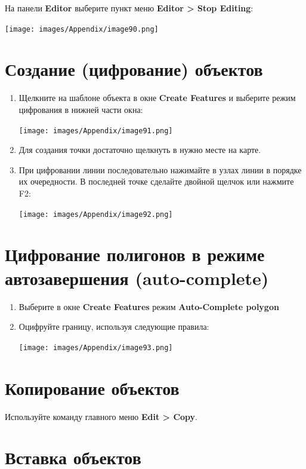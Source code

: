 \documentclass[12pt,]{book}
\begin{document}
На панели \textbf{Editor} выберите пункт меню \textbf{Editor \textgreater{} Stop Editing}:

\texttt{[image: images/Appendix/image90.png]}

\hypertarget{manual-edit-create}{%
\section{Создание (цифрование) объектов}\label{manual-edit-create}}

\begin{enumerate}
\def\labelenumi{\arabic{enumi}.}
\item
  Щелкните на шаблоне объекта в окне \textbf{Create Features} и выберите режим цифрования в нижней части окна:

  \texttt{[image: images/Appendix/image91.png]}
\item
  Для создания точки достаточно щелкнуть в нужно месте на карте.
\item
  При цифровании линии последовательно нажимайте в узлах линии в порядке их очередности. В последней точке сделайте двойной щелчок или нажмите F2:

  \texttt{[image: images/Appendix/image92.png]}
\end{enumerate}

\hypertarget{manual-edit-complete}{%
\section{Цифрование полигонов в режиме автозавершения (auto-complete)}\label{manual-edit-complete}}

\begin{enumerate}
\def\labelenumi{\arabic{enumi}.}
\item
  Выберите в окне \textbf{Create Features} режим \textbf{Auto-Complete polygon}
\item
  Оцифруйте границу, используя следующие правила:

  \texttt{[image: images/Appendix/image93.png]}
\end{enumerate}

\hypertarget{manual-edit-copy}{%
\section{Копирование объектов}\label{manual-edit-copy}}

Используйте команду главного меню \textbf{Edit \textgreater{} Copy}.

\hypertarget{manual-edit-insert}{%
\section{Вставка объектов}\label{manual-edit-insert}}
\end{document}
